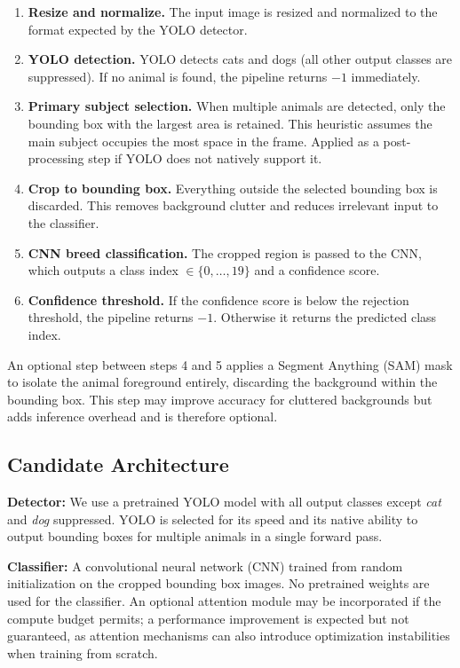 \documentclass[10pt,twocolumn,letterpaper]{article}
\begin{document}
\begin{enumerate}[leftmargin=*, topsep=2pt, itemsep=2pt]
  \item \textbf{Resize and normalize.} The input image is resized and normalized to the format expected by the YOLO detector.

  \item \textbf{YOLO detection.} YOLO detects cats and dogs (all other output classes are suppressed). If no animal is found, the pipeline returns $-1$ immediately.

  \item \textbf{Primary subject selection.} When multiple animals are detected, only the bounding box with the largest area is retained. This heuristic assumes the main subject occupies the most space in the frame. Applied as a post-processing step if YOLO does not natively support it.

  \item \textbf{Crop to bounding box.} Everything outside the selected bounding box is discarded. This removes background clutter and reduces irrelevant input to the classifier.

  \item \textbf{CNN breed classification.} The cropped region is passed to the CNN, which outputs a class index $\in \{0, \ldots, 19\}$ and a confidence score.

  \item \textbf{Confidence threshold.} If the confidence score is below the rejection threshold, the pipeline returns $-1$. Otherwise it returns the predicted class index.
\end{enumerate}

An optional step between steps 4 and 5 applies a Segment Anything (SAM) mask to isolate the animal foreground entirely, discarding the background within the bounding box. This step may improve accuracy for cluttered backgrounds but adds inference overhead and is therefore optional.

\subsection{Candidate Architecture}

\textbf{Detector:} We use a pretrained YOLO model with all output classes except \textit{cat} and \textit{dog} suppressed. YOLO is selected for its speed and its native ability to output bounding boxes for multiple animals in a single forward pass.

\textbf{Classifier:} A convolutional neural network (CNN) trained from random initialization on the cropped bounding box images. No pretrained weights are used for the classifier. An optional attention module may be incorporated if the compute budget permits; a performance improvement is expected but not guaranteed, as attention mechanisms can also introduce optimization instabilities when training from scratch.
\end{document}
